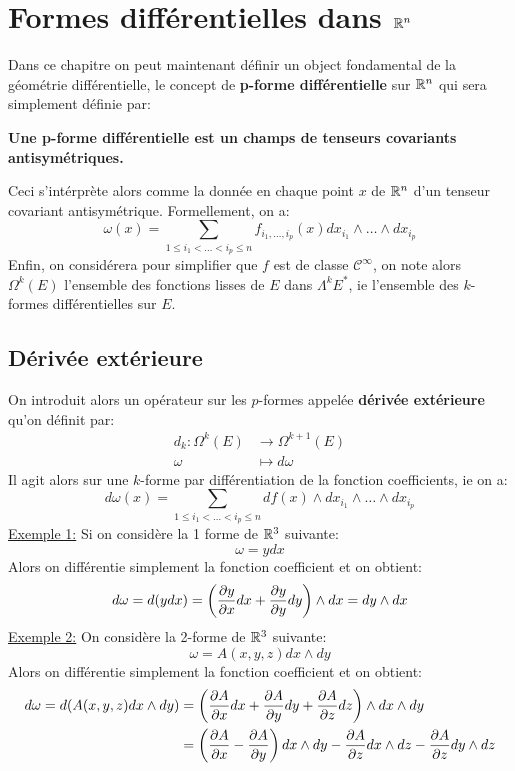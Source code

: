 \chapter{Formes différentielles dans \( \mathbb{R}^n \)}
   Dans ce chapitre on peut maintenant définir un object fondamental de la géométrie différentielle, le concept de \textbf{p-forme différentielle} sur \(\mathbb{R}^n\) qui sera simplement définie par:
   \begin{center}
      \textbf{Une p-forme différentielle est un champs de tenseurs covariants antisymétriques.}
   \end{center}
   Ceci s'intérprète alors comme la donnée en chaque point \(x\) de \(\mathbb{R}^n\) d'un tenseur covariant antisymétrique. Formellement, on a:
   \[
      \omega(x) = \sum_{1 \leq i_1 < \ldots < i_p \leq n} f_{{i_1, \ldots, i_p}}(x) dx_{i_1} \wedge \ldots \wedge dx_{i_p}
   \]
   Enfin, on considérera pour simplifier que \(f\) est de classe \( \mathcal{C}^\infty \), on note alors \( \Omega^k(E)\) l'ensemble des fonctions lisses de \( E \) dans \(\Lambda^kE^*\), ie l'ensemble des \( k \)-formes différentielles sur \( E \).

   \section{Dérivée extérieure}
   On introduit alors un opérateur sur les \(p\)-formes appelée \textbf{dérivée extérieure} qu'on définit par:
   \begin{align*}
      d_k : \Omega^k(E) &\longrightarrow \Omega^{k+1}(E)\\
      \omega &\longmapsto d\omega
   \end{align*}
   Il agit alors sur une \(k\)-forme par différentiation de la fonction coefficients, ie on a:
   \[
      d\omega(x) = \sum_{1 \leq i_1 < \ldots < i_p \leq n} df(x) \wedge dx_{i_1} \wedge \ldots \wedge dx_{i_p}
   \]
   \uline{Exemple 1:} Si on considère la 1 forme de \(\mathbb{R}^3\) suivante:
   \[
      \omega = y dx 
   \]
   Alors on différentie simplement la fonction coefficient et on obtient:
   \[
      d\omega = d(ydx) = \left(\frac{\partial y}{\partial x}dx + \frac{\partial y}{\partial y}dy\right) \wedge dx = dy \wedge dx
   \]
   \uline{Exemple 2:} On considère la 2-forme de \(\mathbb{R}^3\) suivante:
   \[
      \omega = A(x, y, z)dx \wedge dy
   \]
   Alors on différentie simplement la fonction coefficient et on obtient:
   \begin{align*}
      d\omega = d(A(x, y, z)dx \wedge dy) &= \left(\frac{\partial A}{\partial x}dx + \frac{\partial A}{\partial y}dy + \frac{\partial A}{\partial z}dz\right) \wedge dx \wedge dy \\
      &= \left(\frac{\partial A}{\partial x} - \frac{\partial A}{\partial y}\right) dx \wedge dy - \frac{\partial A}{\partial z}dx \wedge dz - \frac{\partial A}{\partial z}dy \wedge dz
   \end{align*}
